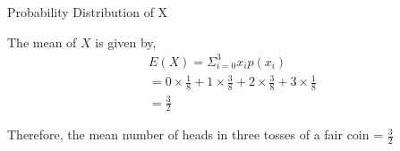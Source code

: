 \documentclass[journal,12pt,twocolumn]{IEEEtran}
\begin{document}
	\begin{table}[!htb]
		\centering
		
		\caption{Probability Distribution of X}
		\label{Table:1}
	\end{table}
	
	The mean of $X$ is given by,
	\begin{align}
	& E(X) = \Sigma^{3}_{i=0}x_i p(x_i) &\\	            
     &= 0 \times \frac{1}{8} + 1 \times \frac{3}{8} + 2 \times \frac{3}{8} + 3 \times \frac{1}{8} \\
     &= \frac{3}{2}
    \end{align}
    
    Therefore, the mean number of heads in three tosses of a fair coin = $\frac{3}{2}$ 
    
\end{document}
